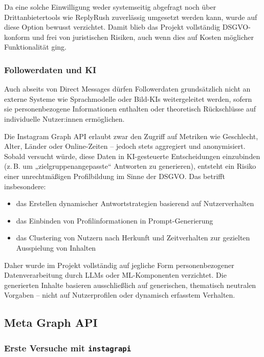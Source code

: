 \documentclass[a4paper,12pt]{article}
\begin{document}
Da eine solche Einwilligung weder systemseitig abgefragt noch über Drittanbietertools wie ReplyRush zuverlässig umgesetzt werden kann, wurde auf diese Option bewusst verzichtet. Damit blieb das Projekt vollständig DSGVO-konform und frei von juristischen Risiken, auch wenn dies auf Kosten möglicher Funktionalität ging.

\subsubsection*{Followerdaten und KI}

Auch abseits von Direct Messages dürfen Followerdaten grundsätzlich nicht an externe Systeme wie Sprachmodelle oder Bild-KIs weitergeleitet werden, sofern sie personenbezogene Informationen enthalten oder theoretisch Rückschlüsse auf individuelle Nutzer:innen ermöglichen.

Die Instagram Graph API erlaubt zwar den Zugriff auf Metriken wie Geschlecht, Alter, Länder oder Online-Zeiten – jedoch stets aggregiert und anonymisiert. Sobald versucht würde, diese Daten in KI-gesteuerte Entscheidungen einzubinden (z.\,B. um „zielgruppenangepasste“ Antworten zu generieren), entsteht ein Risiko einer unrechtmäßigen Profilbildung im Sinne der DSGVO. Das betrifft insbesondere:

\begin{itemize}
    \item das Erstellen dynamischer Antwortstrategien basierend auf Nutzerverhalten
    \item das Einbinden von Profilinformationen in Prompt-Generierung
    \item das Clustering von Nutzern nach Herkunft und Zeitverhalten zur gezielten Ausspielung von Inhalten
\end{itemize}

Daher wurde im Projekt vollständig auf jegliche Form personenbezogener Datenverarbeitung durch LLMs oder ML-Komponenten verzichtet. Die generierten Inhalte basieren ausschließlich auf generischen, thematisch neutralen Vorgaben – nicht auf Nutzerprofilen oder dynamisch erfasstem Verhalten.

\subsection{Meta Graph API}

\subsubsection{Erste Versuche mit \texttt{instagrapi}}
\end{document}
